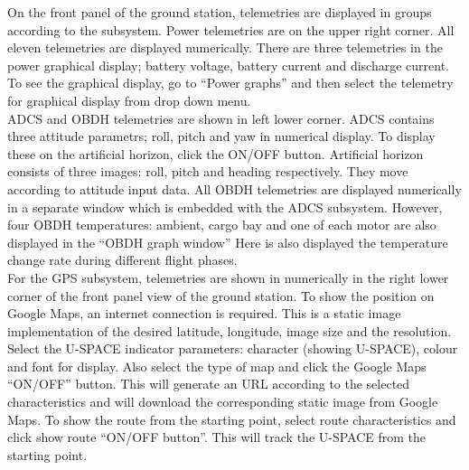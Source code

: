 %
On the front panel of the ground station, telemetries are displayed in groups according to the subsystem. Power telemetries are on the upper right corner. All eleven telemetries are displayed numerically. There are three telemetries in the power graphical display; battery voltage, battery current and discharge current. To see the graphical display, go to ``Power graphs'' and then select the telemetry for graphical display from drop down menu.\\ 
\ac{ADCS} and \ac{OBDH} telemetries are shown in left lower corner. \ac{ADCS} contains three attitude parametrs; roll, pitch and yaw in numerical display. To display these on the artificial horizon, click the ON/OFF button. Artificial horizon consists of three images: roll, pitch and heading respectively. They move according to attitude input data. All \ac{OBDH} telemetries are displayed numerically in a separate window which is embedded with the \ac{ADCS} subsystem. However, four \ac{OBDH} temperatures: ambient, cargo bay and one of each motor are also displayed in the ``\ac{OBDH} graph window'' Here is also displayed the temperature change rate during different flight phases.\\
%
\noindent
For the GPS subsystem, telemetries are shown in numerically in the right lower corner of the front panel view of the ground station. To show the position on Google Maps, an internet connection is required. This is a static image implementation of the desired latitude, longitude, image size and the resolution. Select the \ac{U-SPACE} indicator parameters: character (showing \ac{U-SPACE}), colour and font for display. Also select the type of map and click the Google Maps ``ON/OFF'' button. This will generate an \ac{URL} according to the selected characteristics and will download the corresponding static image from Google Maps. To show the route from the starting point, select route characteristics and click show route ``ON/OFF button''. This will track the \ac{U-SPACE} from the starting point.

